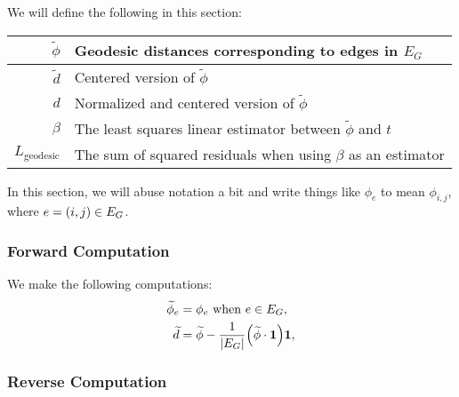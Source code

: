 We will define the following in this section: \begin{center}\begin{tabular}{r|l}
	\(\widetilde{\phi}\) & Geodesic distances corresponding to edges in \(E_G\) \\ \hline
	\(\widetilde{d}\) & Centered version of \(\widetilde{\phi}\) \\ \hline
	\(d\) & Normalized and centered version of \(\widetilde{\phi}\) \\ \hline
	\(\beta\) & The least squares linear estimator between \(\widetilde{\phi}\) and \(t\) \\ \hline
	\(L_{\mathrm{geodesic}}\) & The sum of squared residuals when using \(\beta\) as an estimator
\end{tabular}\end{center} In this section, we will abuse notation a bit and write things like \(\phi_e\) to mean \(\phi_{i, j}\), where \(e = \pof{i, j} \in E_G\).

\subsubsection{Forward Computation}
We make the following computations: \begin{align*}
	\widetilde{\phi}_e &= \phi_e \text{ when \(e \in E_G\)}, \\
	\widetilde{d} &= \widetilde{\phi} - \frac{1}{\abs{E_G}}\pof{\widetilde{\phi} \cdot \mathbf{1}}\mathbf{1},
\end{align*}

\subsubsection{Reverse Computation}